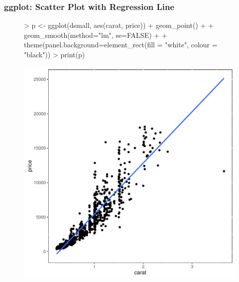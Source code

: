 \documentclass{beamer}
\begin{document}
\begin{frame}[containsverbatim]  
	\frametitle{ggplot: Scatter Plot with Regression Line}
\scriptsize 
\begin{figure}
  \centering
\begin{Schunk}
\begin{Sinput}
> p <- ggplot(dsmall, aes(carat, price)) + geom_point() + 
+             geom_smooth(method="lm", se=FALSE) +
+ 	    theme(panel.background=element_rect(fill = "white", colour = "black"))
> print(p) 
\end{Sinput}
\end{Schunk}
\includegraphics{fig--045}
\label{fig:qplotscatter}
\end{figure}
\end{frame}
\end{document}
